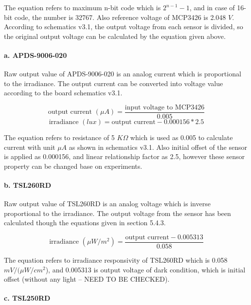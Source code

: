 \bigbreak
The equation refers to maximum n-bit code which is \( 2^{n - 1} - 1 \), and in case of 16-bit code, the number is 32767. Also reference voltage of MCP3426 is 2.048 \(V\). According to schematics v3.1, the output voltage from each sensor is divided, so the original output voltage can be calculated by the equation given above.

\paragraph{a. APDS-9006-020}

Raw output value of APDS-9006-020 is an analog current which is proportional to the irradiance. The output current can be converted into voltage value according to the board schematics v3.1.

{\centering
 \[ \text{output current }(\mu A) = \frac{\text{input voltage to MCP3426}}{0.005} \] 
 \[ \text{irradiance } (lux) = {\text{output current} - 0.000156} * 2.5 \]
 \par
 }
 
\bigbreak
The equation refers to resistance of 5 \(K \Omega \) which is used as 0.005 to calculate current with unit \(\mu A\) as shown in schematics v3.1. Also initial offset of the sensor is applied as 0.000156, and linear relationship factor as 2.5, however these sensor property can be changed base on experiments.
 
\paragraph{b. TSL260RD}

Raw output value of TSL260RD is an analog voltage which is inverse proportional to the irradiance. The output voltage from the sensor has been calculated though the equations given in section 5.4.3.

{\centering
 \[ \text{irradiance } (\mu W/m^2) = \frac{\text{output current} - 0.005313}{0.058} \]
 \par
 }
 
 \bigbreak
 The equation refers to irradiance responsivity of TSL260RD which is 0.058 \(mV/(\mu W/cm^2\)), and 0.005313 is output voltage of dark condition, which is initial offset (without any light -- NEED TO BE CHECKED).
 

\paragraph{c. TSL250RD}

